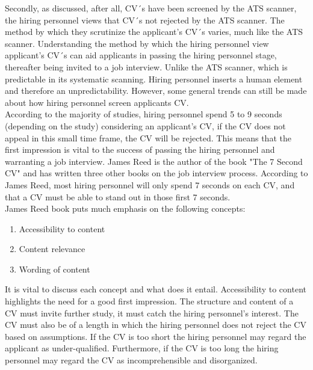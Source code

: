Secondly, as discussed, after all, CV´s have been screened by the ATS scanner, the hiring personnel views that CV´s not rejected by the ATS scanner.
The method by which they scrutinize the applicant's CV´s varies, much like the ATS scanner.
Understanding the method by which the hiring personnel view applicant's CV´s can aid applicants in passing the hiring personnel stage, thereafter being invited to a job interview.
Unlike the ATS scanner, which is predictable in its systematic scanning. 
Hiring personnel inserts a human element and therefore an unpredictability.
However, some general trends can still be made about how hiring personnel screen applicants CV. \\

According to the majority of studies, hiring personnel spend 5 to 9 seconds (depending on the study) considering an applicant's CV, if the CV does not appeal in this small time frame, the CV will be rejected.
This means that the first impression is vital to the success of passing the hiring personnel and warranting a job interview.
James Reed is the author of the book "The 7 Second CV" and has written three other books on the job interview process.\cite{7_second_test}
According to James Reed, most hiring personnel will only spend 7 seconds on each CV, and that a CV must be able to stand out in those first 7 seconds. \cite{7_Seconds_to_Get_a_Recruiter_Attention} \\
James Reed book puts much emphasis on the following concepts:
\begin{enumerate}
   \item Accessibility to content 
   \item Content relevance
   \item Wording of content
\end{enumerate}\cite{7_second_test}
It is vital to discuss each concept and what does it entail.
Accessibility to content highlights the need for a good first impression.
The structure and content of a CV must invite further study, it must catch the hiring personnel's interest.
The CV must also be of a length in which the hiring personnel does not reject the CV based on assumptions.
If the CV is too short the hiring personnel may regard the applicant as under-qualified.
Furthermore, if the CV is too long the hiring personnel may regard the CV as incomprehensible and disorganized. \\

